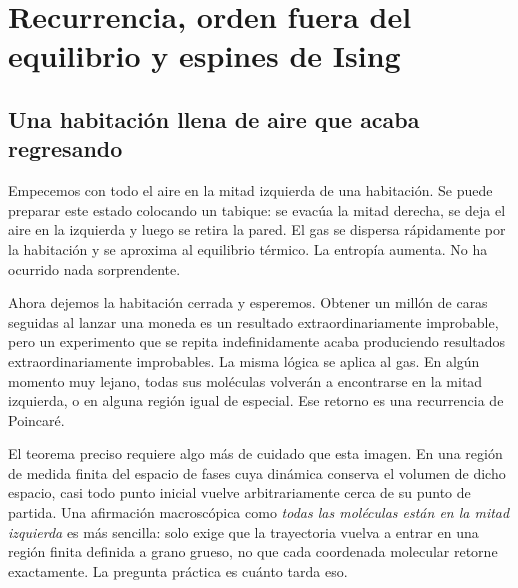 \chapter{Recurrencia, orden fuera del equilibrio y espines de Ising}


\section{Una habitación llena de aire que acaba regresando}

Empecemos con todo el aire en la mitad izquierda de una habitación. Se puede preparar este estado colocando un tabique: se evacúa la mitad derecha, se deja el aire en la izquierda y luego se retira la pared. El gas se dispersa rápidamente por la habitación y se aproxima al equilibrio térmico. La entropía aumenta. No ha ocurrido nada sorprendente.

Ahora dejemos la habitación cerrada y esperemos. Obtener un millón de caras seguidas al lanzar una moneda es un resultado extraordinariamente improbable, pero un experimento que se repita indefinidamente acaba produciendo resultados extraordinariamente improbables. La misma lógica se aplica al gas. En algún momento muy lejano, todas sus moléculas volverán a encontrarse en la mitad izquierda, o en alguna región igual de especial. Ese retorno es una recurrencia de Poincaré.

El teorema preciso requiere algo más de cuidado que esta imagen. En una región de medida finita del espacio de fases cuya dinámica conserva el volumen de dicho espacio, casi todo punto inicial vuelve arbitrariamente cerca de su punto de partida. Una afirmación macroscópica como \emph{todas las moléculas están en la mitad izquierda} es más sencilla: solo exige que la trayectoria vuelva a entrar en una región finita definida a grano grueso, no que cada coordenada molecular retorne exactamente. La pregunta práctica es cuánto tarda eso.

